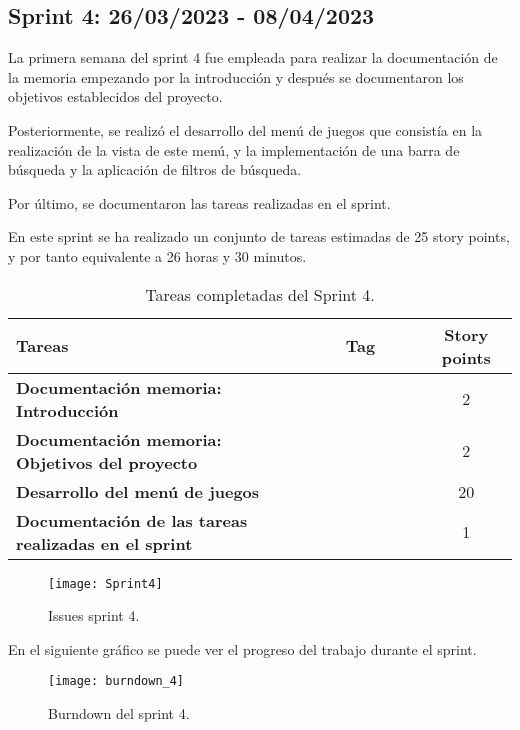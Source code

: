 \subsection{Sprint 4: 26/03/2023 - 08/04/2023}
La primera semana del sprint 4 fue empleada para realizar la documentación de la memoria empezando por la introducción y después se documentaron los objetivos establecidos del proyecto.

Posteriormente, se realizó el desarrollo del menú de juegos que consistía en la realización de la vista de este menú, y la implementación de una barra de búsqueda y la aplicación de filtros de búsqueda.

Por último, se documentaron las tareas realizadas en el sprint.

En este sprint se ha realizado un conjunto de tareas estimadas de 25 story points, y por tanto equivalente a 26 horas y 30 minutos.

\begin{table}[ht!]
    \centering
    \resizebox{15cm}{!} {
    \begin{tabular}{|l|c|c|}
    \hline
    \rowcolor[rgb]{0.99,0.93,0.93}
    \textbf{Tareas}     &\textbf{Tag}     & \textbf{Story points} \\ \hline
    \textbf{Documentación memoria: Introducción}          &\cellcolor[rgb]{0.0,0.33,0.71}\textcolor{white}{documentation}      &2 \\ \hline 
    \textbf{Documentación memoria: Objetivos del proyecto}          &\cellcolor[rgb]{0.0,0.33,0.71}\textcolor{white}{documentation}      &2 \\ \hline 
    \textbf{Desarrollo del menú de juegos}         &\cellcolor[rgb]{0.99,0.83,0.93}\textcolor{white}{development}      &20 \\ \hline 
    \textbf{Documentación de las tareas realizadas en el sprint}         &\cellcolor[rgb]{0.0,0.33,0.71}\textcolor{white}{documentation}      &1 \\ \hline 
    \end{tabular}}
    \caption{Tareas completadas del Sprint 4.}
    \label{tab:my_label}
\end{table}

\begin{figure}[htb]
    \centering
    \texttt{[image: Sprint4]}
    \caption{Issues sprint 4.}
    \label{fig:Sprint4}
\end{figure}
\newpage
En el siguiente gráfico se puede ver el progreso del trabajo durante el sprint.
\begin{figure}[htb]
    \centering
    \texttt{[image: burndown\_4]}
    \caption{Burndown del sprint 4.}
    \label{fig:burndown_4}
\end{figure}

